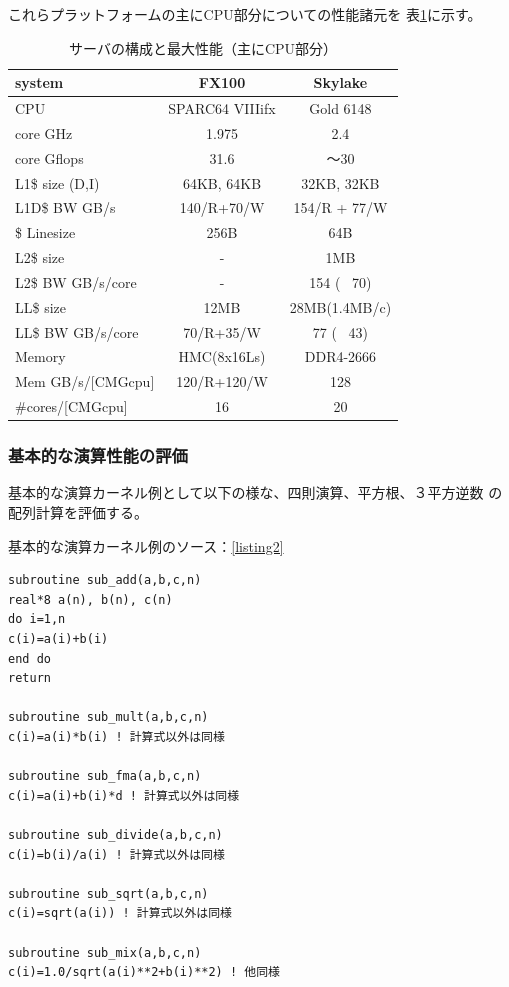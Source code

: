 \documentclass[submit,techrep,noauthor]{ipsj}
\begin{document}
これらプラットフォームの主にCPU部分についての性能諸元を
表\ref{tab:server-config}に示す。

\begin{table}[tb]
\scriptsize
\caption{サーバの構成と最大性能（主にCPU部分）}
\label{tab:server-config}
\footnotesize
\begin{tabular}{l|c|c} \hline
\scriptsize
system			&	FX100	&	Skylake	\\ \hline
CPU				&	SPARC64 VIIIifx	&	Gold 6148	\\ \hline
core GHz		&	1.975	&	2.4	\\ \hline
core Gflops	&	31.6	&	〜30	\\ \hline
L1\$ size (D,I)		&	64KB, 64KB	&	32KB, 32KB	\\ \hline
L1D\$ BW GB/s	&	140/R+70/W	&	154/R + 77/W	\\ \hline
\$ Linesize 	&	256B	&	64B	\\ \hline
L2\$ size		&	-	&	1MB	\\ \hline
L2\$ BW GB/s/core	&	-	&	154 ( ~70)	\\ \hline
LL\$ size		&	12MB	&	28MB(1.4MB/c)	\\ \hline
LL\$ BW GB/s/core	&	70/R+35/W	&	77 ( ~43)	\\ \hline
Memory			&	HMC(8x16Ls)	&	DDR4-2666	\\ \hline
Mem GB/s/[CMGcpu]	&	120/R+120/W	&	128	\\ \hline
\#cores/[CMGcpu]	&	16	&	20	\\ \hline
\end{tabular}
\end{table}


\subsubsection{基本的な演算性能の評価}

基本的な演算カーネル例として以下の様な、四則演算、平方根、３平方逆数
の配列計算を評価する。

基本的な演算カーネル例のソース：\lstlistingname \ref{listing2}

\begin{lstlisting}[caption={\hfill},label={listing2},captionpos=t]
subroutine sub_add(a,b,c,n)
real*8 a(n), b(n), c(n)  
do i=1,n
c(i)=a(i)+b(i)
end do
return

subroutine sub_mult(a,b,c,n)
c(i)=a(i)*b(i) ! 計算式以外は同様

subroutine sub_fma(a,b,c,n)
c(i)=a(i)+b(i)*d ! 計算式以外は同様

subroutine sub_divide(a,b,c,n)
c(i)=b(i)/a(i) ! 計算式以外は同様

subroutine sub_sqrt(a,b,c,n)
c(i)=sqrt(a(i)) ! 計算式以外は同様

subroutine sub_mix(a,b,c,n)
c(i)=1.0/sqrt(a(i)**2+b(i)**2) ! 他同様

\end{lstlisting}
\end{document}
